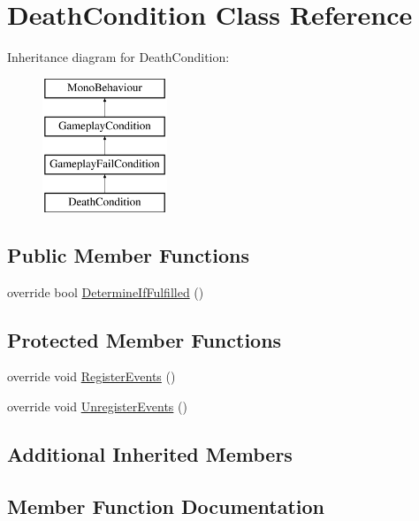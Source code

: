 \hypertarget{class_death_condition}{}\section{Death\+Condition Class Reference}
\label{class_death_condition}
Inheritance diagram for Death\+Condition\+:\begin{figure}[H]
\begin{center}
\leavevmode
\includegraphics[height=4.000000cm]{class_death_condition}
\end{center}
\end{figure}
\subsection*{Public Member Functions}
\begin{DoxyCompactItemize}
\item 
override bool \mbox{\hyperlink{class_death_condition_a175822d80f10b8ec4ccadca271197530}{Determine\+If\+Fulfilled}} ()
\end{DoxyCompactItemize}
\subsection*{Protected Member Functions}
\begin{DoxyCompactItemize}
\item 
override void \mbox{\hyperlink{class_death_condition_a6cb1fe3d0a6eb7df7c91df62bd549b46}{Register\+Events}} ()
\item 
override void \mbox{\hyperlink{class_death_condition_ad6c07ec8151eb65a0ef1844853b526a0}{Unregister\+Events}} ()
\end{DoxyCompactItemize}
\subsection*{Additional Inherited Members}


\subsection{Member Function Documentation}
\mbox{\label{class_death_condition_a175822d80f10b8ec4ccadca271197530}} 
